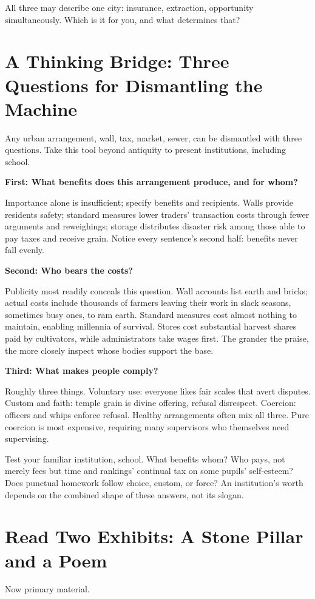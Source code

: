 All three may describe one city: insurance, extraction, opportunity simultaneously. Which is it for you, and what determines that?

\section[Thinking Bridge: Three Questions]{A Thinking Bridge: Three Questions for Dismantling the Machine}
Any urban arrangement, wall, tax, market, sewer, can be dismantled with three questions. Take this tool beyond antiquity to present institutions, including school.

\textbf{First: What benefits does this arrangement produce, and for whom?}

Importance alone is insufficient; specify benefits and recipients. Walls provide residents safety; standard measures lower traders' transaction costs through fewer arguments and reweighings; storage distributes disaster risk among those able to pay taxes and receive grain. Notice every sentence's second half: benefits never fall evenly.

\textbf{Second: Who bears the costs?}

Publicity most readily conceals this question. Wall accounts list earth and bricks; actual costs include thousands of farmers leaving their work in slack seasons, sometimes busy ones, to ram earth. Standard measures cost almost nothing to maintain, enabling millennia of survival. Stores cost substantial harvest shares paid by cultivators, while administrators take wages first. The grander the praise, the more closely inspect whose bodies support the base.

\textbf{Third: What makes people comply?}

Roughly three things. Voluntary use: everyone likes fair scales that avert disputes. Custom and faith: temple grain is divine offering, refusal disrespect. Coercion: officers and whips enforce refusal. Healthy arrangements often mix all three. Pure coercion is most expensive, requiring many supervisors who themselves need supervising.

Test your familiar institution, school. What benefits whom? Who pays, not merely fees but time and rankings' continual tax on some pupils' self-esteem? Does punctual homework follow choice, custom, or force? An institution's worth depends on the combined shape of these answers, not its slogan.

\section[Two Exhibits: A Stone and a Poem]{Read Two Exhibits: A Stone Pillar and a Poem}
Now primary material.

